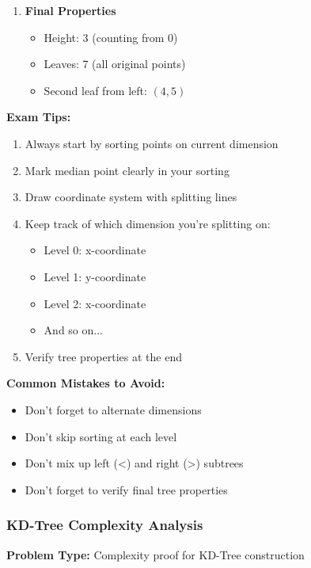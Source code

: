 \begin{enumerate}[leftmargin=*,label=\arabic*.]
    \item \textbf{Final Properties}
    \begin{itemize}[noitemsep,leftmargin=*]
        \item Height: 3 (counting from 0)
        \item Leaves: 7 (all original points)
        \item Second leaf from left: $(4,5)$
    \end{itemize}
\end{enumerate}

\textbf{Exam Tips:}
\begin{enumerate}[noitemsep,leftmargin=*]
    \item Always start by sorting points on current dimension
    \item Mark median point clearly in your sorting
    \item Draw coordinate system with splitting lines
    \item Keep track of which dimension you're splitting on:
        \begin{itemize}[noitemsep,topsep=0pt]
            \item Level 0: x-coordinate
            \item Level 1: y-coordinate
            \item Level 2: x-coordinate
            \item And so on...
        \end{itemize}
    \item Verify tree properties at the end
\end{enumerate}

\textbf{Common Mistakes to Avoid:}
\begin{itemize}[noitemsep,leftmargin=*]
    \item Don't forget to alternate dimensions
    \item Don't skip sorting at each level
    \item Don't mix up left (<) and right (>) subtrees
    \item Don't forget to verify final tree properties
\end{itemize}

\FloatBarrier

\subsubsection{KD-Tree Complexity Analysis}
\textbf{Problem Type:} Complexity proof for KD-Tree construction

